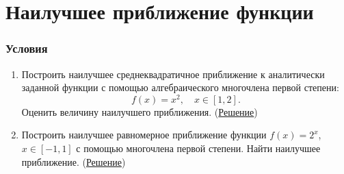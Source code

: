 \documentclass[a4paper, 12pt]{article}
\begin{document}
	\section*{Наилучшее приближение функции}
	\subsubsection*{Условия}
	\begin{enumerate}
		\item Построить наилучшее среднеквадратичное приближение к аналитически заданной функции с помощью алгебраического многочлена первой степени: $$f(x) = x^2,\quad x \in [1,2].$$ Оценить величину наилучшего приближения. (\hyperlink{t1}{Решение})
		\item Построить наилучшее равномерное приближение функции $f(x) = 2^x$, $x\in [-1,1]$ с помощью многочлена первой степени. Найти наилучшее приближение. (\hyperlink{t2}{Решение})
	\end{enumerate}
	
	\newpage
\end{document}
